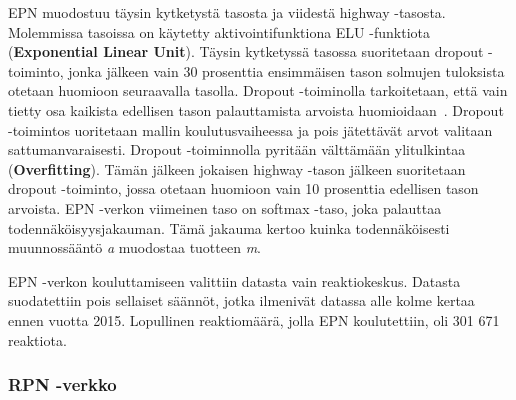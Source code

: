\documentclass[finnish,twoside,censored,tkt,sw-line]{HYthesisML}
\begin{document}
EPN muodostuu täysin kytketystä tasosta ja viidestä highway -tasosta.
Molemmissa tasoissa on käytetty aktivointifunktiona ELU -funktiota (\textbf{Exponential Linear Unit}).
Täysin kytketyssä tasossa suoritetaan dropout -toiminto, jonka jälkeen vain 30 prosenttia ensimmäisen tason solmujen tuloksista otetaan huomioon seuraavalla tasolla.
Dropout -toiminolla tarkoitetaan, että vain tietty osa kaikista edellisen tason palauttamista arvoista huomioidaan~\cite{hinton2012improving}.
Dropout -toimintos uoritetaan mallin koulutusvaiheessa ja pois jätettävät arvot valitaan sattumanvaraisesti.
Dropout -toiminnolla pyritään välttämään ylitulkintaa (\textbf{Overfitting}).
Tämän jälkeen jokaisen highway -tason jälkeen suoritetaan dropout -toiminto, jossa otetaan huomioon vain 10 prosenttia edellisen tason arvoista.
EPN -verkon viimeinen taso on softmax -taso, joka palauttaa todennäköisyysjakauman.
Tämä jakauma kertoo kuinka todennäköisesti muunnossääntö \emph{a} muodostaa tuotteen \emph{m}.

EPN -verkon kouluttamiseen valittiin datasta vain reaktiokeskus.
Datasta suodatettiin pois sellaiset säännöt, jotka ilmenivät datassa alle kolme kertaa ennen vuotta 2015.
Lopullinen reaktiomäärä, jolla EPN koulutettiin, oli 301 671 reaktiota.

\subsubsection{RPN -verkko}
\end{document}
